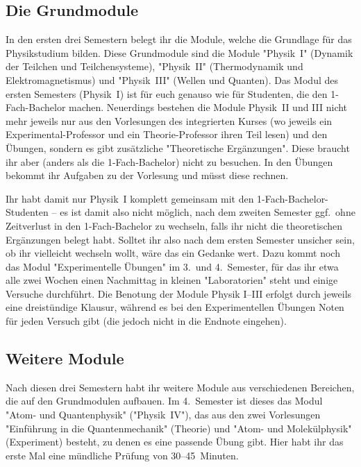 \begin{multicols*}{2}
\subsection*{Die Grundmodule}
In den ersten drei Semestern belegt ihr die Module, welche die Grundlage für das Physikstudium bilden. Diese Grundmodule sind die Module "Physik~I" (Dynamik der Teilchen und Teilchensysteme), "Physik~II" (Thermodynamik und Elektromagnetismus) und "Physik~III" (Wellen und Quanten). Das Modul des ersten Semesters (Physik~I) ist für euch genauso wie für Studenten, die den 1-Fach-Bachelor machen. Neuerdings bestehen die Module Physik~II und III nicht mehr jeweils nur aus den Vorlesungen des integrierten Kurses (wo jeweils ein Experimental-Professor und ein Theorie-Professor ihren Teil lesen) und den Übungen, sondern es gibt zusätzliche "Theoretische Ergänzungen". Diese braucht ihr aber (anders als die 1-Fach-Bachelor) nicht zu besuchen. In den Übungen bekommt ihr Aufgaben zu der Vorlesung und müsst diese rechnen.

Ihr habt damit nur Physik~I komplett gemeinsam mit den 1-Fach-Bachelor-Studenten -- es ist damit also nicht möglich, nach dem zweiten Semester ggf.\ ohne Zeitverlust in den 1-Fach-Bachelor zu wechseln, falls ihr nicht die theoretischen Ergänzungen belegt habt. Solltet ihr also nach dem ersten Semester unsicher sein, ob ihr vielleicht wechseln wollt, wäre das ein Gedanke wert. Dazu kommt noch das Modul "Experimentelle Übungen" im 3.\ und 4.~Semester, für das ihr etwa alle zwei Wochen einen Nachmittag in kleinen "Laboratorien" steht und einige Versuche durchführt. Die Benotung der Module Physik I--III erfolgt durch jeweils eine dreistündige Klausur, während es bei den Experimentellen Übungen Noten für jeden Versuch gibt (die jedoch nicht in die Endnote eingehen).

\subsection*{Weitere Module}
%
Nach diesen drei Semestern habt ihr weitere Module aus verschiedenen Bereichen, die auf den Grundmodulen aufbauen. Im 4.~Semester ist dieses das Modul "Atom- und Quantenphysik" ("Physik~IV"), das aus den zwei Vorlesungen "Einführung in die Quantenmechanik" (Theorie) und "Atom- und Molekülphysik" (Experiment) besteht, zu denen es eine passende Übung gibt. Hier habt ihr das erste Mal eine mündliche Prüfung von 30--45~Minuten.


\end{multicols*}
